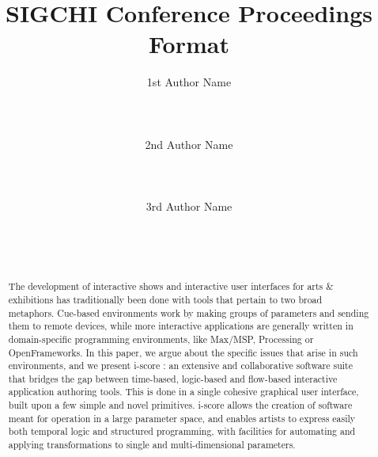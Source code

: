 \documentclass{sigchi}
\begin{document}
\title{SIGCHI Conference Proceedings Format}

\author{
  \alignauthor 1st Author Name\\
    \\
    \\
    \\
  \alignauthor 2nd Author Name\\
    \\
    \\
    \\
  \alignauthor 3rd Author Name\\
    \\
    \\
    \\
}

\maketitle

\begin{abstract}
  The development of interactive shows and interactive user interfaces for arts \& exhibitions
has traditionally been done with tools that pertain to two broad metaphors. 
Cue-based environments work by making groups of parameters and sending them to remote devices, 
while more interactive applications are generally written in domain-specific 
programming environments, like Max/MSP, Processing or OpenFrameworks.
  In this paper, we argue about the specific issues that arise in such environments, and we present 
i-score : an extensive and collaborative software suite that bridges
the gap between time-based, logic-based and flow-based interactive application authoring tools. 
This is done in a single cohesive graphical user interface, built upon a few simple and novel primitives.
  i-score allows the creation of software meant for operation in a large parameter space, 
and enables artists to express easily both temporal logic and structured programming, 
with facilities for automating and applying transformations to single and multi-dimensional parameters.
\end{abstract}

\end{document}
